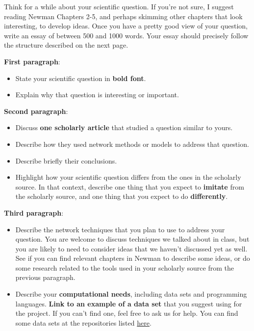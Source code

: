 \documentclass{hw}
\begin{document}
Think for a while about your scientific question. 
If you're not sure, I suggest reading Newman Chapters 2-5, and perhaps skimming other chapters that look interesting, to develop ideas. 
Once you have a pretty good view of your question, write an essay of between 500 and 1000 words. 
Your essay should precisely follow the structure described on the next page.  

\pagebreak

 \noindent \textbf{First paragraph}: 
    \begin{itemize}
        \item State your scientific question in \textbf{bold font}.
        \item Explain why that question is interesting or important. 
    \end{itemize}
     \textbf{Second paragraph}:
    \begin{itemize}
        \item Discuss \textbf{one scholarly article} that studied a question similar to yours. 
        \item Describe how they used network methods or models to address that question. 
        \item Describe briefly their conclusions. 
        \item Highlight how your scientific question differs from the ones in the scholarly source. In that context, describe one thing that you expect to \textbf{imitate} from the scholarly source, and one thing that you expect to do \textbf{differently}.
    \end{itemize}
    \textbf{Third paragraph}:
    \begin{itemize}
        \item Describe the network techniques that you plan to use to address your question. You are welcome to discuss techniques we talked about in class, but you are likely to need to consider ideas that we haven't discussed yet as well. See if you can find relevant chapters in Newman to describe some ideas, or do some research related to the tools used in your scholarly source from the previous paragraph. 
        \item Describe your \textbf{computational needs}, including data sets and programming languages. 
        \textbf{Link to an example of a data set} that you suggest using for the project.
        If you can't find one, feel free to ask us for help. 
        You can find some data sets at the repositories listed \href{http://www.philchodrow.com/intro-networks/appendices/additional_resources.html#data-sets}{here}. 
    \end{itemize}
\end{document}
